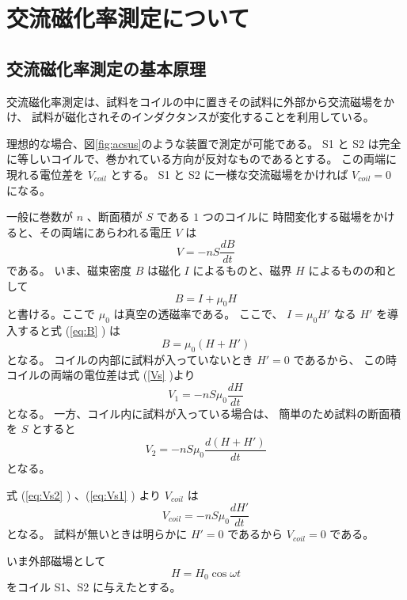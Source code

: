 \chapter{交流磁化率測定について}

\section{交流磁化率測定の基本原理}


交流磁化率測定は、試料をコイルの中に置きその試料に外部から交流磁場をかけ、
試料が磁化されそのインダクタンスが変化することを利用している。

理想的な場合、図\ref{fig:acsus}のような装置で測定が可能である。
S1 と S2 は完全に等しいコイルで、巻かれている方向が反対なものであるとする。
この両端に現れる電位差を $V_{coil}$ とする。
S1 と S2 に一様な交流磁場をかければ $V_{coil} = 0$ になる。

一般に巻数が $n$ 、断面積が $S$ である $1$ つのコイルに
時間変化する磁場をかけると、その両端にあらわれる電圧 $V$ は
\begin{equation}
V= - n S \frac{dB}{dt}
\label{Vs}
\end{equation}
である。
いま、磁束密度 $B$ は磁化 $I$ によるものと、磁界 $H$ によるものの和として
\begin{equation}
B = I + \mu_0 H
\label{eq:B}
\end{equation}
と書ける。ここで $\mu_0$ は真空の透磁率である。
ここで、 $I=\mu_0 H'$ なる $H'$ を導入すると式 (\ref{eq:B} ) は
\begin{equation}
B=\mu_0(H+H')
\label{eq:B2}
\end{equation}
となる。
コイルの内部に試料が入っていないとき $H'=0$ であるから、
この時コイルの両端の電位差は式 (\ref{Vs} )より
\begin{equation}
V_1=-n S \mu_0 \frac{dH}{dt}
\label{eq:Vs2}
\end{equation}
となる。
一方、コイル内に試料が入っている場合は、
簡単のため試料の断面積を $S$ とすると
\begin{equation}
V_2=-n S \mu_0 \frac{d(H+H')}{dt}
\label{eq:Vs1} 
\end{equation}
となる。

式 (\ref{eq:Vs2} ) 、(\ref{eq:Vs1} ) より
$V_{coil}$ は
\begin{equation}
V_{coil}=- n S \mu_0 \frac{d H'}{dt}
\label{eq:Vcoil}
\end{equation}
となる。
試料が無いときは明らかに $H'=0$ であるから
$V_{coil}=0$ である。

いま外部磁場として
\begin{equation}
H=H_0 \cos \omega t
\label{eq:H}
\end{equation}
をコイル S1、S2 に与えたとする。


